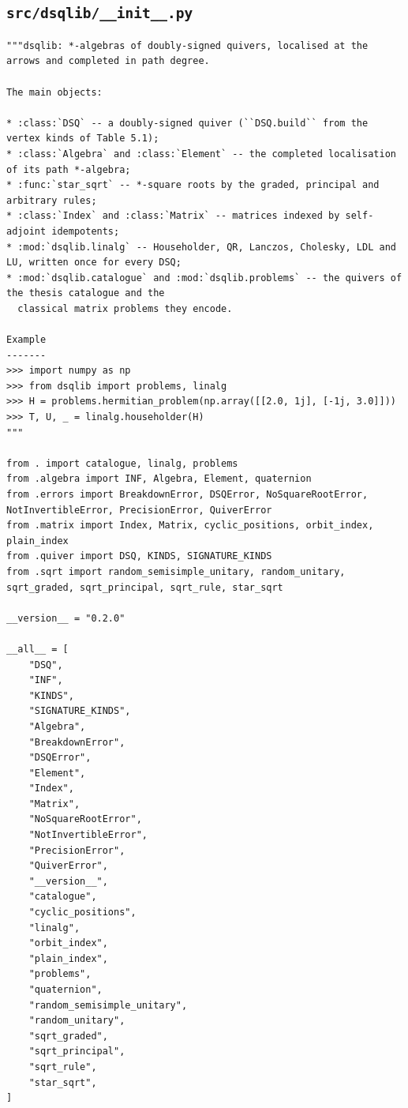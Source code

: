 \documentclass[12pt, a4paper]{report}
\theoremstyle{plain}
\theoremstyle{definition}
\theoremstyle{remark}
\theoremstyle{plain}
\begin{document}
\subsection{\texorpdfstring{\texttt{src/dsqlib/\_\_init\_\_.py}}{src/dsqlib/\_\_init\_\_.py}}
\begin{lstlisting}[style=dsqcode]
"""dsqlib: *-algebras of doubly-signed quivers, localised at the arrows and completed in path degree.

The main objects:

* :class:`DSQ` -- a doubly-signed quiver (``DSQ.build`` from the vertex kinds of Table 5.1);
* :class:`Algebra` and :class:`Element` -- the completed localisation of its path *-algebra;
* :func:`star_sqrt` -- *-square roots by the graded, principal and arbitrary rules;
* :class:`Index` and :class:`Matrix` -- matrices indexed by self-adjoint idempotents;
* :mod:`dsqlib.linalg` -- Householder, QR, Lanczos, Cholesky, LDL and LU, written once for every DSQ;
* :mod:`dsqlib.catalogue` and :mod:`dsqlib.problems` -- the quivers of the thesis catalogue and the
  classical matrix problems they encode.

Example
-------
>>> import numpy as np
>>> from dsqlib import problems, linalg
>>> H = problems.hermitian_problem(np.array([[2.0, 1j], [-1j, 3.0]]))
>>> T, U, _ = linalg.householder(H)
"""

from . import catalogue, linalg, problems
from .algebra import INF, Algebra, Element, quaternion
from .errors import BreakdownError, DSQError, NoSquareRootError, NotInvertibleError, PrecisionError, QuiverError
from .matrix import Index, Matrix, cyclic_positions, orbit_index, plain_index
from .quiver import DSQ, KINDS, SIGNATURE_KINDS
from .sqrt import random_semisimple_unitary, random_unitary, sqrt_graded, sqrt_principal, sqrt_rule, star_sqrt

__version__ = "0.2.0"

__all__ = [
    "DSQ",
    "INF",
    "KINDS",
    "SIGNATURE_KINDS",
    "Algebra",
    "BreakdownError",
    "DSQError",
    "Element",
    "Index",
    "Matrix",
    "NoSquareRootError",
    "NotInvertibleError",
    "PrecisionError",
    "QuiverError",
    "__version__",
    "catalogue",
    "cyclic_positions",
    "linalg",
    "orbit_index",
    "plain_index",
    "problems",
    "quaternion",
    "random_semisimple_unitary",
    "random_unitary",
    "sqrt_graded",
    "sqrt_principal",
    "sqrt_rule",
    "star_sqrt",
]
\end{lstlisting}
\end{document}
